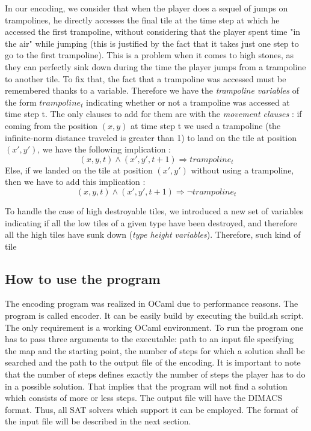 \documentclass[a4paper, 12pt, titlepage]{article}
\begin{document}
In our encoding, we consider that when the player does a sequel of jumps on
trampolines, he directly accesses the final tile at the time step at which he
accessed the first trampoline, without considering that the player spent time
"in the air" while jumping (this is justified by the fact that it takes just one
step to go to the first trampoline). This is a problem when it comes to high
stones, as they can perfectly sink down during the time the player jumps from a
trampoline to another tile. To fix that, the fact that a trampoline was accessed
must be remembered thanks to a variable. Therefore we have the {\em trampoline
variables} of the form $trampoline_t$ indicating whether or not a trampoline was
accessed at time step t. The only clauses to add for them are with the
{\em movement clauses} : if coming from the position $(x, y)$ at time step t we
used a trampoline (the infinite-norm distance traveled is greater than 1) to
land on the tile at position $(x', y')$, we have the following implication :
\begin{equation}
(x, y, t) \wedge (x', y', t+1) \Rightarrow trampoline_t
\end{equation}
Else, if we landed on the tile at position $(x', y')$ without using a
trampoline, then we have to add this implication :
\begin{equation}
(x, y, t) \wedge (x', y', t+1) \Rightarrow \neg trampoline_t
\end{equation}

To handle the case of high destroyable tiles, we introduced a new set of
variables indicating if all the low tiles of a given type have been destroyed,
and therefore all the high tiles have sunk down ({\em type height variables}).
Therefore, such kind of tile


\subsection{How to use the program}

The encoding program was realized in OCaml due to performance reasons. 
The program is called encoder. 
It can be easily build by executing the build.sh script. 
The only requirement is a working OCaml environment. 
To run the program one has to pass three arguments to the executable: path to an input file specifying the map and the starting point, the number of steps for which a solution shall be searched and the path to the output file of the encoding. 
It is important to note that the number of steps defines exactly the number of steps the player has to do in a possible solution. 
That implies that the program will not find a solution which consists of more or less steps. 
The output file will have the DIMACS format. 
Thus, all SAT solvers which support it can be employed. 
The format of the input file will be described in the next section.
\end{document}
